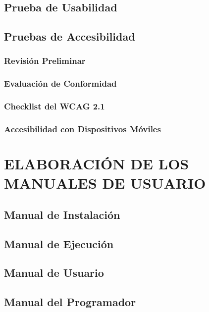 \documentclass[11pt]{report}
\begin{document}
\subsection{Prueba de Usabilidad}

\subsection{Pruebas de Accesibilidad} 
 
\subsubsection{Revisión Preliminar} 

\subsubsection{Evaluación de Conformidad} 

\subsubsection{Checklist del WCAG 2.1} 

\subsubsection{Accesibilidad con Dispositivos Móviles} 


\newpage
\section{ELABORACIÓN DE LOS MANUALES DE USUARIO}

\subsection{Manual de Instalación} 

\subsection{Manual de Ejecución} 

\subsection{Manual de Usuario} 

\subsection{Manual del Programador}
\end{document}
